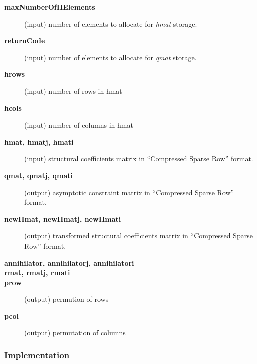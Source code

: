 \documentclass{article}
\begin{document}
\begin{description}
\item[{\bf *maxNumberOfHElements}] (input) number of elements to allocate
for {\em hmat} storage.
\item[{\bf returnCode}] (input) number of elements to allocate
for {\em qmat} storage.
\item[{\bf hrows}] (input) number of rows in hmat
\item[{\bf hcols}] (input) number of columns in hmat
\item[{\bf hmat, hmatj, hmati}] (input) structural coefficients matrix in ``Compressed Sparse Row'' format.
\item[{\bf qmat, qmatj, qmati}] (output) asymptotic constraint matrix in ``Compressed Sparse Row'' format.
\item[{\bf newHmat, newHmatj, newHmati}] (output) transformed structural coefficients matrix in ``Compressed Sparse Row'' format.
\item[{\bf annihilator, annihilatorj, annihilatori}]
\item[{\bf rmat, rmatj,  rmati}]
\item[{\bf prow}] (output) permution of rows
\item[{\bf pcol}] (output) permutation of columns
\end{description}



\subsubsection{Implementation}
\end{document}
